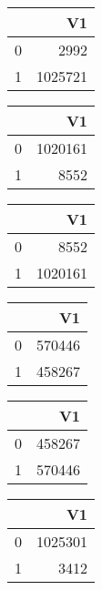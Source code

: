 \bigskip\bigskip
\centering
\begin{tabular}{rr}
  \hline
 & V1 \\ 
  \hline
0 & 2992 \\ 
  1 & 1025721 \\ 
   \hline
\end{tabular}

\bigskip\bigskip
\centering
\begin{tabular}{rr}
  \hline
 & V1 \\ 
  \hline
0 & 1020161 \\ 
  1 & 8552 \\ 
   \hline
\end{tabular}

\bigskip\bigskip
\centering
\begin{tabular}{rr}
  \hline
 & V1 \\ 
  \hline
0 & 8552 \\ 
  1 & 1020161 \\ 
   \hline
\end{tabular}

\bigskip\bigskip
\centering
\begin{tabular}{rr}
  \hline
 & V1 \\ 
  \hline
0 & 570446 \\ 
  1 & 458267 \\ 
   \hline
\end{tabular}

\bigskip\bigskip
\centering
\begin{tabular}{rr}
  \hline
 & V1 \\ 
  \hline
0 & 458267 \\ 
  1 & 570446 \\ 
   \hline
\end{tabular}

\bigskip\bigskip
\centering
\begin{tabular}{rr}
  \hline
 & V1 \\ 
  \hline
0 & 1025301 \\ 
  1 & 3412 \\ 
   \hline
\end{tabular}

